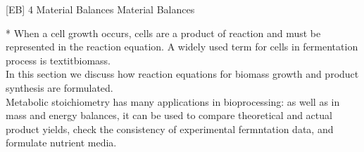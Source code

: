 \documentclass["EB-Notebook.tex"]{subfiles}
\begin{document}

[EB]
{4 Material Balances} %
{Material Balances} %

\setcounter{subpart}{5}

\begin{sectionBox}*{} %
  When a cell growth occurs, cells are a product of reaction and must be represented in the reaction equation. A widely used term for cells in fermentation process is textit{biomass}.\\[1ex]
  In this section we discuss how reaction equations for biomass growth and product synthesis are formulated.\\[1ex]
  Metabolic stoichiometry has many applications in bioprocessing: as well as in mass and energy balances, it can be used to compare theoretical and actual product yields, check the consistency of experimental fermntation data, and formulate nutrient media.
\end{sectionBox}
\end{document}
